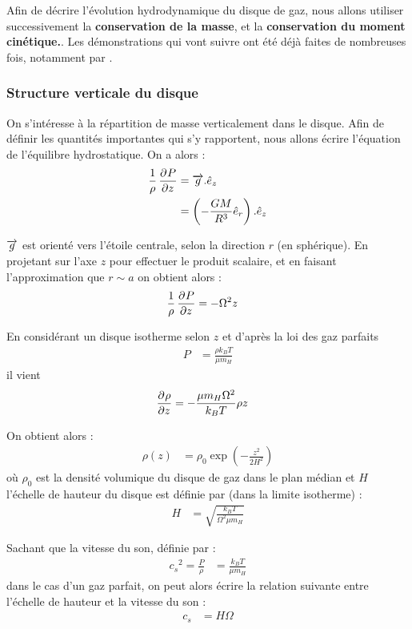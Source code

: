 \bigskip

Afin de décrire l'évolution hydrodynamique du disque de gaz, nous allons utiliser successivement la \textbf{conservation de la masse}, et la \textbf{conservation du moment cinétique.}. Les démonstrations qui vont suivre ont été déjà faites de nombreuses fois, notamment par \citep{pringle1981accretion}.

\subsubsection{Structure verticale du disque}
On s'intéresse à la répartition de masse verticalement dans le disque. Afin de définir les quantités importantes qui s'y rapportent, nous allons écrire l'équation de l'équilibre hydrostatique. On a alors :
\begin{align}
\frac{1}{\rho}\mathinner{ \dfrac{\partial{^{}}P}{\partial{{z}^{}}} } &= {\overrightarrow{g}}.\hat{e}_z\\
&= \left(-\frac{GM}{R^3}\hat{e}_r\right).\hat{e}_z
\end{align}

${\overrightarrow{g}}$ est orienté vers l'étoile centrale, selon la direction $r$ (en sphérique). En projetant sur l'axe $z$ pour effectuer le produit scalaire, et en faisant l'approximation que $r\sim a$ on obtient alors :
\begin{align}
\frac{1}{\rho}\mathinner{ \dfrac{\partial{^{}}P}{\partial{{z}^{}}} } &= -\Omega^2 z
\end{align}

En considérant un disque isotherme selon $z$ et d'après la loi des gaz parfaits
\begin{align}
P &= \frac{\rho k_B T}{\mu m_H}
\end{align}
il vient
\begin{align}
\mathinner{ \dfrac{\partial{^{}}\rho}{\partial{{z}^{}}} } &= -\frac{\mu m_H\Omega^2}{k_B T}\rho z
\end{align}

On obtient alors :
\begin{align}
\rho(z) &= \rho_0\exp\left(-\frac{z^2}{2H^2}\right)
\end{align}
où $\rho_0$ est la densité volumique du disque de gaz dans le plan médian et $H$ l'échelle de hauteur du disque est définie par (dans la limite isotherme) : 
\begin{align}
H &= \sqrt{\frac{k_B T}{\Omega^2 \mu m_H}}
\end{align}

\bigskip

Sachant que la vitesse du son, définie par :
\begin{align}
{c_s}^2=\frac{P}{\rho} &= \frac{k_B T}{\mu m_H}
\end{align}
dans le cas d'un gaz parfait, on peut alors écrire la relation suivante entre l'échelle de hauteur et la vitesse du son : 
\begin{align}
c_s &= H\Omega
\end{align}

